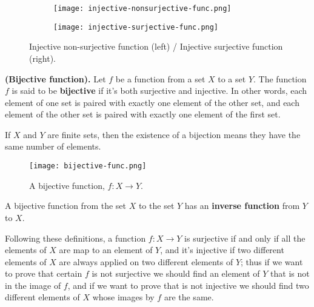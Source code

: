\begin{figure}[htbp]
    \centering
    \begin{subfigure}{.25\textwidth}
        \texttt{[image: injective-nonsurjective-func.png]}
    \end{subfigure}
    \hspace{1cm}
    \begin{subfigure}{.25\textwidth}
        \texttt{[image: injective-surjective-func.png]}
    \end{subfigure}
    \caption{Injective non-surjective function (left) / Injective surjective function (right).}
\end{figure}

\begin{definition}
    \textbf{(Bijective function).} Let $f$ be a function from a set $X$ to a set $Y$. The function $f$ is said to be \textbf{bijective} if it's both surjective and injective. In other words, each element of one set is paired with exactly one element of the other set, and each element of the other set is paired with exactly one element of the first set.
\end{definition}

\begin{remark}
    If $X$ and $Y$ are finite sets, then the existence of a bijection means they have the same number of elements.
\end{remark}
\begin{figure}[htbp]
    \centerline{\texttt{[image: bijective-func.png]}}
    \caption{A bijective function, $f:X\to Y$.}
\end{figure}

A bijective function from the set $X$ to the set $Y$ has an \textbf{inverse function} from $Y$ to $X$.

Following these definitions, a function $f:X\to Y$ is surjective if and only if all the elements of $X$ are map to an element of $Y$, and it's injective if two different elements of $X$ are always applied on two different elements of $Y$; thus if we want to prove that certain $f$ is not surjective we should find an element of $Y$ that is not in the image of $f$, and if we want to prove that is not injective we should find two different elements of $X$ whose images by $f$ are the same.

